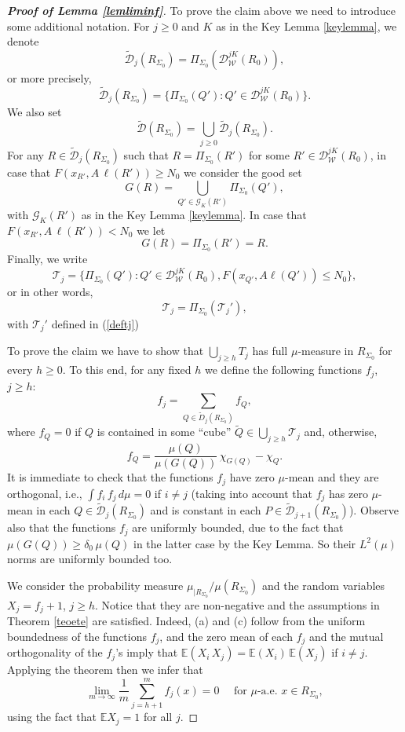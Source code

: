 \documentclass[11pt]{amsart}
\newcommand{\E}{{\mathbb E}}
\newcommand{\DD}{{\mathcal D}}
\newcommand{\WW}{{\mathcal W}}
\newcommand{\GZ}{{\mathcal G}}
\newcommand{\TT}{{\mathcal T}}
\newcommand{\rf}[1]{{(\ref{#1})}}
\newcommand{\vv}{{\vspace{2mm}}}
\newcommand{\wt}[1]{{\widetilde{#1}}}
\theoremstyle{definition}
\theoremstyle{remark}
\numberwithin{equation}{section}
\begin{document}
\begin{proof}[\bf Proof of Lemma \ref{lemliminf}]
\vv
To prove the claim above we need to introduce some additional notation. For $j\geq 0$ and $K$ as in
the Key Lemma \ref{keylemma}, we denote
$$\wt\DD_j(R_{\Sigma_0})= \Pi_{\Sigma_0} (\DD_\WW^{jK}(R_0)),$$
or more precisely,
$$\wt \DD_j(R_{\Sigma_0}) = \big\{\Pi_{\Sigma_0}(Q'):Q'\in \DD_\WW^{jK}(R_0)\big\}.$$
We also set
$$\wt \DD(R_{\Sigma_0}) = \bigcup_{j\geq0}\wt \DD_j(R_{\Sigma_0}).$$
For any $R\in\wt\DD_j(R_{\Sigma_0})$ such that $R=\Pi_{\Sigma_0}(R')$ for some $R'\in
 \DD_\WW^{jK}(R_0)$, in case that $F(x_{R'},A\,\ell(R'))\geq N_0$ 
 we consider the good set
$$G(R) = \bigcup_{Q'\in \GZ_K(R')} \Pi_{\Sigma_0}(Q'),$$
with $\GZ_K(R')$ as in the Key Lemma \ref{keylemma}. In case that $F(x_{R'},A\,\ell(R'))< N_0$
we let 
$$G(R) =  \Pi_{\Sigma_0}(R')=R.$$
 Finally, we write
$$\TT_j = \big\{ \Pi_{\Sigma_0}(Q'):Q'\in\DD_\WW^{jK}(R_0), F(x_{Q'},A\ell(Q'))\leq N_0\big\},$$
or in other words, 
$$\TT_j=\Pi_{\Sigma_0}(\TT_j'),$$
with $\TT_j'$ defined in \rf{deftj}

To prove the claim we have to show that
$\bigcup_{j\geq h} T_j$ has full $\mu$-measure in $R_{\Sigma_0}$ for every $h\geq0$. To this
end, for any fixed $h$ we define the following functions $f_j$, $j\geq h$:
$$f_j = \sum_{Q\in\wt D_j(R_{\Sigma_0})} f_Q,$$
where $f_Q=0$ if $Q$ is contained in some ``cube'' $\wt Q\in\bigcup_{j\geq h}\TT_j$ and, otherwise,
$$f_Q= \frac{\mu(Q)}{\mu(G(Q))}\,\chi_{G(Q)}- \chi_Q.$$
It is immediate to check that the functions $f_j$ have zero $\mu$-mean and they are orthogonal, i.e.,
$\int f_i\,f_j\,d\mu=0$ if $i\neq j$ (taking into account that $f_j$ has zero $\mu$-mean in each
$Q\in\wt\DD_{j}(R_{\Sigma_0})$ and
is constant in each $P\in\wt\DD_{j+1}(R_{\Sigma_0})$). Observe also that the functions $f_j$ are uniformly bounded, due
to the fact that $\mu(G(Q))\geq \delta_0\,\mu(Q)$ in the latter case by the Key Lemma. So their $L^2(\mu)$
norms are uniformly bounded too.

We consider the probability measure $\mu_{|R_{\Sigma_0}}/\mu(R_{\Sigma_0})$ and
the random variables $X_j= f_j+1$, $j\geq h$. Notice that they are non-negative and the assumptions
in Theorem \ref{teoete} are satisfied. Indeed, (a) and (c) follow from the uniform boundedness of the
functions $f_j$, and the zero mean of each $f_j$ and the mutual orthogonality of the $f_j$'s imply that
$\E(X_i\,X_j) = \E(X_i)\,\E(X_j)$ if $i\neq j$. Applying the theorem then we infer that
\begin{equation}\label{eqlaw}
\lim_{m\to\infty} \frac1m \sum_{j= h+1}^m f_j(x) = 0\quad \mbox{ for $\mu$-a.e.\ $x\in R_{\Sigma_0}$},
\end{equation}
using the fact that $\E X_j=1$ for all $j$.


\end{proof}
\end{document}
